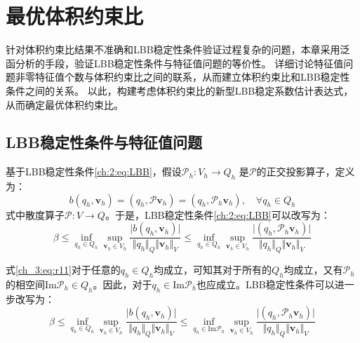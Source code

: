 \chapter{最优体积约束比}
针对体积约束比结果不准确和LBB稳定性条件验证过程复杂的问题，本章采用泛函分析的手段，验证LBB稳定性条件与特征值问题的等价性。
详细讨论特征值问题非零特征值个数与体积约束比之间的联系，从而建立体积约束比和LBB稳定性条件之间的关系。
以此，构建考虑体积约束比的新型LBB稳定系数估计表达式，从而确定最优体积约束比。

\section{LBB稳定性条件与特征值问题}

基于LBB稳定性条件\eqref{ch:2:eq:LBB}，假设$\mathcal P_h:V_h \rightarrow Q_h$ 是$\mathcal P$的正交投影算子，定义为：
\begin{equation}\label{ch_3:eq:Ph}
    b(q_h,\boldsymbol v_h) = (q_h, \mathcal P \boldsymbol v_h) = (q_h, \mathcal P_h \boldsymbol v_h), \quad \forall q_h \in Q_h
\end{equation}
式中散度算子$\mathcal P:V\rightarrow Q$。于是，LBB稳定性条件\eqref{ch:2:eq:LBB}可以改写为：
\begin{equation} \label{ch_3:eq:r11}
    \beta \le \inf_{q_h \in Q_h} \sup_{\boldsymbol v_h \in V_h} \frac{\vert b(q_h,\boldsymbol v_h) \vert}{\Vert q_h \Vert_Q \Vert \boldsymbol v_h \Vert_V} 
    \le \inf_{q_h \in Q_h} \sup_{\boldsymbol v_h \in V_h} \frac{\vert (q_h,\mathcal P_h \boldsymbol v_h) \vert}{\Vert q_h \Vert_Q \Vert \boldsymbol v_h \Vert_V}
\end{equation}

式\eqref{ch_3:eq:r11}对于任意的$q_h \in Q_h$均成立，可知其对于所有的$Q_h$均成立，又有$\mathcal P_h$的相空间$\mathrm{Im}\mathcal P_h \in Q_h$。因此，对于$q_h \in \mathrm{Im}\mathcal P_h$也应成立。LBB稳定性条件可以进一步改写为：
\begin{equation} \label{ch_3:eq:r12}
        \beta \le \inf_{q_h \in Q_h} \sup_{\boldsymbol v_h \in V_h} \frac{\vert b(q_h,\boldsymbol v_h) \vert}{\Vert q_h \Vert_Q \Vert \boldsymbol v_h \Vert_V} 
        \le \inf_{q_h \in \mathrm{Im}\mathcal P_h} \sup_{\boldsymbol v_h \in V_h} \frac{\vert (q_h,\mathcal P_h \boldsymbol v_h) \vert}{\Vert q_h \Vert_Q \Vert \boldsymbol v_h \Vert_V}
\end{equation}

